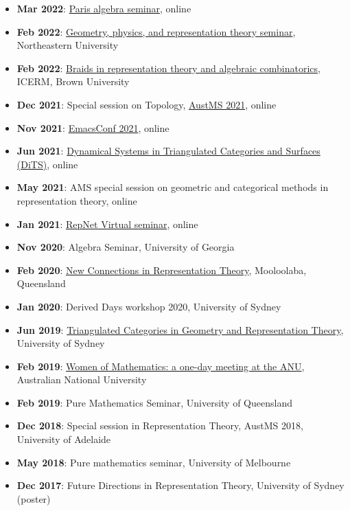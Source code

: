 \documentclass[a4paper]{moderncv}
\begin{document}
\begin{itemize}
\item \textbf{Mar 2022}: \href{https://www.imj-prg.fr/gestion/evenement/affEvenement/1}{Paris algebra seminar}, online
\item \textbf{Feb 2022}: \href{http://mathserver.neu.edu/\~robin/Seminars/GPRT/index.html}{Geometry, physics, and representation theory seminar}, Northeastern University
\item \textbf{Feb 2022}: \href{https://icerm.brown.edu/programs/sp-s22/w1/}{Braids in representation theory and algebraic combinatorics}, ICERM, Brown University
\item \textbf{Dec 2021}: Special session on Topology, \href{https://austms.org.au/event/austms-2021/}{AustMS 2021}, online
\item \textbf{Nov 2021}: \href{https://emacsconf.org/2021/}{EmacsConf 2021}, online
\item \textbf{Jun 2021}: \href{https://sites.google.com/view/symposium-dits/}{Dynamical Systems in Triangulated Categories and Surfaces (DiTS)}, online
\item \textbf{May 2021}: AMS special session on geometric and categorical methods in representation theory, online
\item \textbf{Jan 2021}: \href{https://sites.google.com/view/repnetvirtualseminar/home}{RepNet Virtual seminar}, online
\item \textbf{Nov 2020}: Algebra Seminar, University of Georgia
\item \textbf{Feb 2020}: \href{https://sites.google.com/view/mooloolaba2020/home}{New Connections in Representation Theory}, Mooloolaba, Queensland
\item \textbf{Jan 2020}: Derived Days workshop 2020, University of Sydney
\item \textbf{Jun 2019}: \href{https://sites.google.com/site/ausreptheory/workshop-2019}{Triangulated Categories in Geometry and Representation Theory}, University of Sydney
\item \textbf{Feb 2019}: \href{https://genderinstitute.anu.edu.au/women-mathematics-one-day-meeting-anu}{Women of Mathematics: a one-day meeting at the ANU}, Australian National University
\item \textbf{Feb 2019}: Pure Mathematics Seminar, University of Queensland
\item \textbf{Dec 2018}: Special session in Representation Theory, AustMS 2018, University of Adelaide
\item \textbf{May 2018}: Pure mathematics seminar, University of Melbourne
\item \textbf{Dec 2017}: Future Directions in Representation Theory, University of Sydney (poster)

\end{itemize}
\end{document}
